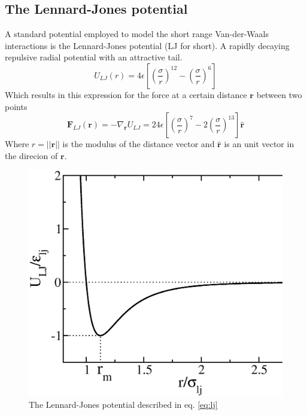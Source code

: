 \documentclass[ twoside,openright,titlepage,numbers=noenddot,%
headinclude,footinclude,cleardoublepage=empty,abstract=on,
BCOR=5mm,paper=a4,fontsize=11pt, dvipsnames
]{scrreprt}
\renewcommand{\vec}[1]{\bm{#1}}
\begin{document}
\subsection{The Lennard-Jones potential}
A standard potential employed to model the short range Van-der-Waals interactions is the Lennard-Jones potential \cite{lj} (\gls{LJ} for short). A rapidly decaying repulsive radial potential with an attractive tail.
\begin{equation}
  \label{eq:lj}
  U_{LJ}(r) = 4 \epsilon \left[ \left(\frac{\sigma}{r}\right)^{12} - \left( \frac{\sigma}{r}\right)^6 \right] 
\end{equation}
Which results in this expression for the force at a certain distance $\vec{r}$ between two points
\begin{equation}
  \label{eq:ljf}
  \vec{F}_{LJ}(\vec{r}) = -\nabla_{\vec{r}} U_{LJ} = 24 \epsilon \left[ \left(\frac{\sigma}{r}\right)^{7} - 2\left( \frac{\sigma}{r}\right)^{13} \right] \hat{\vec{r}}
\end{equation}
Where $r = ||\vec{r}||$ is the modulus of the distance vector and $\hat{\vec{r}}$ is an unit vector in the direcion of $\vec{r}$.
\begin{figure}
  \centering
  \includegraphics[width=\textwidth]{lj}
  \caption{The Lennard-Jones potential described in eq. \ref{eq:lj}}
  \label{fig:lj}
\end{figure}
\end{document}
